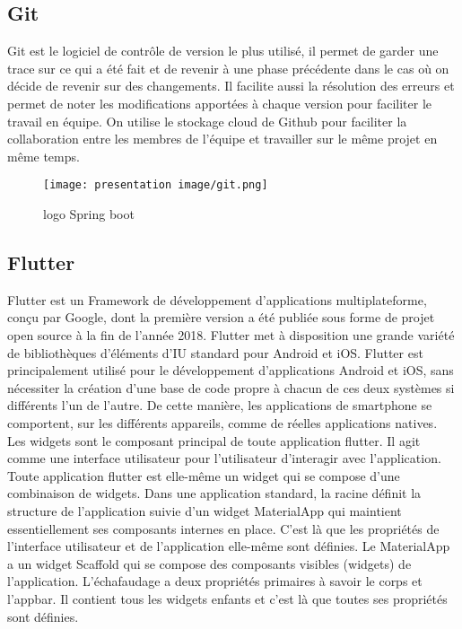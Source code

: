 \subsection{Git}
Git est le logiciel de contrôle de version le plus utilisé, il permet de garder une trace sur ce qui a été fait et de revenir à une phase précédente dans le cas où on décide de revenir sur des changements. Il facilite aussi la résolution des erreurs et permet de noter les modifications apportées à chaque version pour faciliter le travail en équipe.
On utilise le stockage cloud de Github pour faciliter la collaboration entre les membres de l’équipe et travailler sur le même projet en même temps.
\begin{figure}[!h]
\begin{center}
\texttt{[image: presentation image/git.png]}
\end{center}
\caption{logo Spring boot}
\end{figure}

\subsection{Flutter}
Flutter est un Framework de développement d’applications multiplateforme, conçu par Google, dont la première version a été publiée sous forme de projet open source à la fin de l’année 2018. Flutter met à disposition une grande variété de bibliothèques d’éléments d’IU standard pour Android et iOS. Flutter est principalement utilisé pour le développement d'applications Android et iOS, sans nécessiter la création d’une base de code propre à chacun de ces deux systèmes si différents l’un de l’autre. De cette manière, les applications de smartphone se comportent, sur les différents appareils, comme de réelles applications natives.\\

Les widgets sont le composant principal de toute application flutter. Il agit comme une interface utilisateur pour l’utilisateur d’interagir avec l’application. Toute application flutter est elle-même un widget qui se compose d’une combinaison de widgets. Dans une application standard, la racine définit la structure de l’application suivie d’un widget MaterialApp qui maintient essentiellement ses composants internes en place. C’est là que les propriétés de l’interface utilisateur et de l’application elle-même sont définies. Le MaterialApp a un widget Scaffold qui se compose des composants visibles (widgets) de l’application. L’échafaudage a deux propriétés primaires à savoir le corps et l’appbar. Il contient tous les widgets enfants et c’est là que toutes ses propriétés sont définies.

